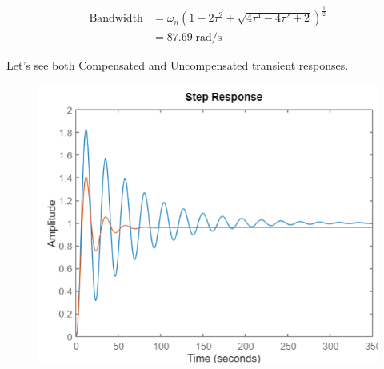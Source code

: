 \documentclass[12pt]{article}
\begin{document}
\begin{equation}
  \begin{aligned}
    \text{Bandwidth} &= \omega_n(1- 2\tau^2 + \sqrt{4\tau^4 - 4\tau^2 + 2})^{\frac{1}{2}} \\
    &= 87.69\; \text{rad/s}
  \end{aligned}
\end{equation}

Let's see both Compensated and Uncompensated transient responses.

\begin{figure}[H]
  \centering
  \includegraphics[width=0.8\linewidth]{images/plot8.png}
  \label{fig:plot_8}
\end{figure}
\end{document}
